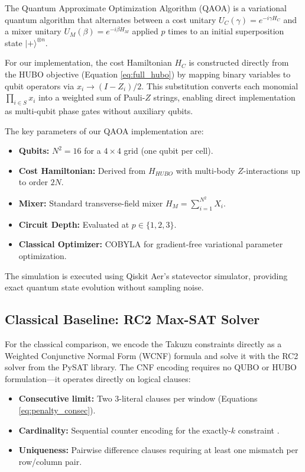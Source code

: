 \documentclass[eng]{ajceam-class}
\begin{document}
The Quantum Approximate Optimization Algorithm (QAOA) \cite{farhi2014qaoa} is a variational quantum algorithm that alternates between a cost unitary $U_C(\gamma) = e^{-i\gamma H_C}$ and a mixer unitary $U_M(\beta) = e^{-i\beta H_M}$ applied $p$ times to an initial superposition state $|+\rangle^{\otimes n}$.

For our implementation, the cost Hamiltonian $H_C$ is constructed directly from the HUBO objective (Equation \ref{eq:full_hubo}) by mapping binary variables to qubit operators via $x_i \rightarrow (I - Z_i)/2$. This substitution converts each monomial $\prod_{i \in S} x_i$ into a weighted sum of Pauli-$Z$ strings, enabling direct implementation as multi-qubit phase gates without auxiliary qubits.

The key parameters of our QAOA implementation are:

\begin{itemize}
 \item \textbf{Qubits:} $N^2 = 16$ for a $4 \times 4$ grid (one qubit per cell).
 \item \textbf{Cost Hamiltonian:} Derived from $H_{HUBO}$ with multi-body $Z$-interactions up to order $2N$.
 \item \textbf{Mixer:} Standard transverse-field mixer $H_M = \sum_{i=1}^{N^2} X_i$.
 \item \textbf{Circuit Depth:} Evaluated at $p \in \{1, 2, 3\}$.
 \item \textbf{Classical Optimizer:} COBYLA \cite{powell1994cobyla} for gradient-free variational parameter optimization.
\end{itemize}

The simulation is executed using Qiskit Aer's statevector simulator, providing exact quantum state evolution without sampling noise.

\subsection{Classical Baseline: RC2 Max-SAT Solver}

For the classical comparison, we encode the Takuzu constraints directly as a Weighted Conjunctive Normal Form (WCNF) formula and solve it with the RC2 solver \cite{ignatiev2019rc2} from the PySAT library. The CNF encoding requires no QUBO or HUBO formulation---it operates directly on logical clauses:

\begin{itemize}
 \item \textbf{Consecutive limit:} Two 3-literal clauses per window (Equations \ref{eq:penalty_consec}).
 \item \textbf{Cardinality:} Sequential counter encoding for the exactly-$k$ constraint \cite{sinz2005towards}.
 \item \textbf{Uniqueness:} Pairwise difference clauses requiring at least one mismatch per row/column pair.
\end{itemize}
\end{document}
